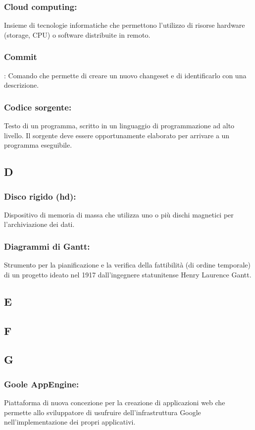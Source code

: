 \subsubsection*{Cloud computing:} Insieme di tecnologie informatiche che
permettono l'utilizzo di risorse hardware (storage, CPU) o software distribuite in remoto.

\subsubsection*{Commit}: Comando che permette di creare un nuovo changeset e di
identificarlo con una descrizione.

\subsubsection*{Codice sorgente:} Testo di un programma, scritto in un
linguaggio di programmazione ad alto livello. Il sorgente deve essere opportunamente elaborato
per arrivare a un programma eseguibile.

\subsection*{\huge{D}}
\subsubsection*{Disco rigido (hd):} Dispositivo di memoria di massa che utilizza
uno o pi\`u dischi magnetici per l'archiviazione dei dati.

\subsubsection*{Diagrammi di Gantt:} Strumento per la pianificazione e la
verifica della fattibilit\`a (di ordine temporale) di un progetto ideato nel 1917 dall'ingegnere
statunitense Henry Laurence Gantt.
\subsection*{\huge{E}}
\subsection*{\huge{F}}
\subsection*{\huge{G}}

\subsubsection*{Goole AppEngine:} Piattaforma di nuova concezione per
la creazione di applicazioni web che permette allo sviluppatore di usufruire dell'infrastruttura
Google nell'implementazione dei propri applicativi.

